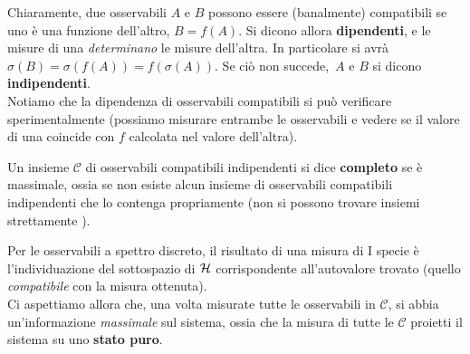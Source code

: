 \documentclass[../../FisicaTeorica.tex]{subfiles}
\begin{document}
Chiaramente, due osservabili $A$ e $B$ possono essere (banalmente) compatibili se uno è una funzione dell'altro, $B=f(A)$. Si dicono allora \textbf{dipendenti}, e le misure di una \textit{determinano} le misure dell'altra.
In particolare si avrà $\sigma(B)=\sigma(f(A))=f(\sigma(A))$. Se ciò non succede,\ $A$ e $B$ si dicono \textbf{indipendenti}.\\
Notiamo che la dipendenza di osservabili compatibili si può verificare sperimentalmente (possiamo misurare entrambe le osservabili e vedere se il valore di una coincide con $f$ calcolata nel valore dell'altra).\\
\begin{dfn}
Un insieme $\mathcal{C}$ di osservabili compatibili indipendenti si dice \textbf{completo} se è massimale, ossia se non esiste alcun insieme di osservabili compatibili indipendenti che lo contenga propriamente (non si possono trovare insiemi strettamente ).
\end{dfn}
Per le osservabili a spettro discreto, il risultato di una misura di I specie è l'individuazione del sottospazio di $\mathcal{H}$ corrispondente all'autovalore trovato (quello \textit{compatibile} con la misura ottenuta).\\
Ci aspettiamo allora che, una volta misurate tutte le osservabili in $\mathcal{C}$, si abbia un'informazione \textit{massimale} sul sistema, ossia che la misura di tutte le $\mathcal{C}$ proietti il sistema su uno \textbf{stato puro}.
\end{document}
